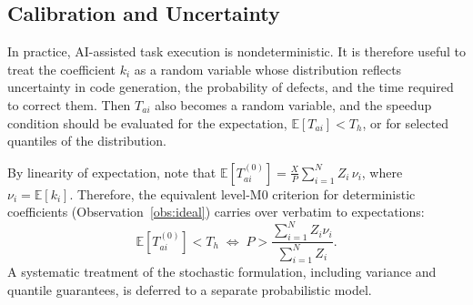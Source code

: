 \subsection{Calibration and Uncertainty}

\begin{remark}\label{rem:stochastic}
In practice, AI-assisted task execution is nondeterministic. It is therefore useful to treat the coefficient $k_i$ as a random variable whose distribution reflects uncertainty in code generation, the probability of defects, and the time required to correct them. Then $T_{ai}$ also becomes a random variable, and the speedup condition should be evaluated for the expectation, $\mathbb{E}[T_{ai}] < T_h$, or for selected quantiles of the distribution.

By linearity of expectation, note that $\mathbb{E}[T_{ai}^{(0)}] = \frac{X}{P}\sum_{i=1}^{N} Z_i\,\nu_i$, where $\nu_i = \mathbb{E}[k_i]$. Therefore, the equivalent level-M0 criterion for deterministic coefficients (Observation~\ref{obs:ideal}) carries over verbatim to expectations:
\[
  \mathbb{E}[T_{ai}^{(0)}] < T_h \;\iff\; P > \frac{\sum_{i=1}^{N} Z_i \nu_i}{\sum_{i=1}^{N} Z_i}.
\]
A systematic treatment of the stochastic formulation, including variance and quantile guarantees, is deferred to a separate probabilistic model.
\end{remark}

